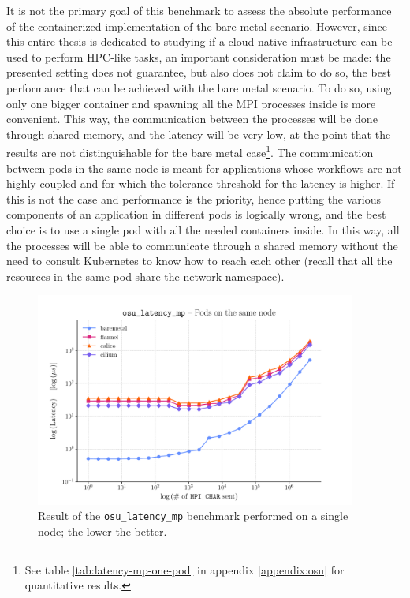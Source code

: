 It is not the primary goal of this benchmark to assess the absolute performance
of the containerized implementation of the bare metal scenario. However, since
this entire thesis is dedicated to studying if a cloud-native infrastructure can
be used to perform HPC-like tasks, an important consideration must be made: the
presented setting does not guarantee, but also does not claim to do so, the best
performance that can be achieved with the bare metal scenario.
To do so, using only one bigger container and spawning all the MPI processes
inside is more convenient. This way, the communication between the processes
will be done through shared memory, and the latency will be very low, at the
point that the results are not distinguishable for the bare metal
case\footnote{See table
  \ref{tab:latency-mp-one-pod} in appendix \ref{appendix:osu} for
  quantitative results.}.
The communication between pods in the same node is meant for applications whose
workflows are not highly coupled and for which the tolerance threshold for the
latency is higher. If this is not the case and performance is the priority,
hence putting the various components of an application in different pods is
logically wrong, and the best choice is to use a single pod with all the needed
containers inside. In this way, all the processes will be able to communicate
through a shared memory without the need to consult Kubernetes to know how to
reach each other (recall that all the resources in the same pod share the
network namespace).


\begin{figure}
  \centering
  \includegraphics[width=0.94\textwidth]{img/chpt3/latency_mp-1-node}
  \caption{Result of the \texttt{osu\_latency\_mp} benchmark performed on a single
    node; the lower the better.}
  \label{fig:latency-mp-1-node}
\end{figure}


